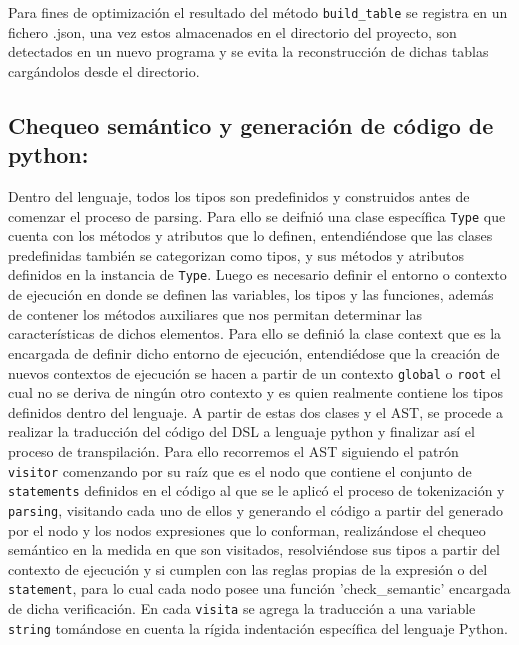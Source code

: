 \documentclass[twoside]{article}
\begin{document}
		Para fines de optimizaci\'on el resultado del m\'etodo \texttt{build\_table} se registra en un fichero .json, una vez estos almacenados en el directorio del proyecto, son detectados en un nuevo programa y se evita la reconstrucción de dichas tablas carg\'andolos desde el directorio.
		
		\subsection{Chequeo sem\'antico y generaci\'on de c\'odigo de python:}
		Dentro del lenguaje, todos los tipos son predefinidos y construidos antes de comenzar  el proceso de parsing. Para ello se deifni\'o una clase espec\'ifica \texttt{Type} que cuenta con los m\'etodos y atributos que lo definen, entendi\'endose que las clases predefinidas tambi\'en se categorizan como tipos, y sus m\'etodos y atributos definidos en la instancia de \texttt{Type}.  Luego es necesario definir el entorno o contexto de ejecuci\'on en donde se definen las variables, los tipos y las funciones, adem\'as de contener los m\'etodos auxiliares que nos permitan determinar las caracter\'isticas de  dichos elementos. Para ello se defini\'o la clase context que es la encargada de definir dicho entorno de ejecuci\'on, entendi\'edose que la creaci\'on de nuevos contextos de ejecuci\'on se hacen a partir de un contexto \texttt{global} o \texttt{root} el cual no se deriva de ning\'un otro contexto y es quien realmente contiene los tipos definidos dentro del lenguaje. A partir de estas dos clases y el AST, se procede a realizar la traducci\'on del c\'odigo del DSL a lenguaje python y finalizar as\'i el proceso de transpilaci\'on. Para ello recorremos el AST siguiendo el patr\'on \texttt{visitor} comenzando por su ra\'iz que es el nodo que contiene el conjunto de \texttt{statements} definidos en el c\'odigo al que se le aplic\'o el proceso de tokenizaci\'on y \texttt{parsing}, visitando cada uno de ellos y generando el c\'odigo a partir del generado por el nodo y los nodos expresiones que lo conforman, realiz\'andose el chequeo sem\'antico en la medida en que son visitados, resolvi\'endose sus tipos a partir del contexto de ejecuci\'on y si cumplen con las reglas propias de la expresi\'on o del \texttt{statement}, para lo cual cada nodo posee una funci\'on 'check\_semantic' encargada de dicha verificaci\'on. En cada \texttt{visita} se agrega la traducci\'on a una variable \texttt{string} tom\'andose en cuenta la r\'igida indentaci\'on espec\'ifica del lenguaje Python.
		
\end{document}
